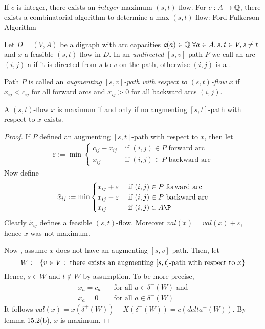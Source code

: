 \begin{cor}
	If $c$ is integer, there exists an \emph{integer} maximum $(s,t)$-flow. For $c: A \rightarrow \mathbb{Q}$, there exists a combinatorial algorithm to determine a max $(s,t)$ flow: Ford-Fulkerson Algorithm
\end{cor}
\begin{defn}
	Let $D = (V,A)$ be a digraph with arc capacities $c(a) \in \mathbb{Q} \; \forall a \in A, s,t \in V, s \not = t$ and $x$ a feasible $(s,t)$-flow in $D$. In an \emph{undirected} $[s,v]$-path $P$ we call an arc $(i,j)$ a  if it is directed from $s$ to $v$ on the path, otherwise $(i,j)$ is a .
	
	Path $P$ is called an \emph{augmenting $[s,v]$-path with respect to $(s,t)$-flow $x$} if $x_{ij} < c_{ij}$ for all forward arcs and $x_{ij} > 0$ for all backward arcs $(i,j)$.
\end{defn}
\begin{thm}
A $(s,t)$-flow $x$ is maximum if and only if no augmenting $[s,t]$-path with respect to $x$ exists.
\end{thm}

\begin{proof}
	If $P$ defined an augmenting $[s,t]$-path with respect to $x$, then let
	\begin{align*}
		\varepsilon := \min \begin{cases}
			c_{ij}-x_{ij} & \text{ if $(i,j) \in P$ forward arc} \\
			x_{ij} & \text{ if $(i,j) \in P$ backward arc}
		\end{cases}
	\end{align*}
	Now define
	\begin{align*}
		\tilde x_{ij} := \min \begin{cases}
			x_{ij} + \varepsilon &\text{ if $(i,j) \in P$ forward arc} \\
			x_{ij} - \varepsilon &\text{ if $(i,j) \in P$ backward arc} \\
			x_{ij} &\text{ if $(i,j) \in A\P$}
		\end{cases}
	\end{align*}
	Clearly $\tilde x_{ij}$ defines a feasible $(s,t)$-flow. Moreover $val(\tilde x) = val(x) + \varepsilon$, hence $x$ was not maximum.
	
	Now , assume $x$ does not have an augmenting $[s,v]$-path. Then, let
	\[
		W:=\left\{v\in V: \text{ there exists an augmenting $[s,t]$-path with respect to $x$}\right\}
	\]
	Hence, $s \in W$ and $t \not \in W$ by assumption. To be more precise,
	\begin{align*}
		x_a = c_a \quad &\text{for all } a \in \delta^+(W) \text{ and} \\
		x_a = 0 \quad & \text{for all } a \in \delta^-(W)
	\end{align*}
	It follows $val(x) = x ( \delta ^+(W))- X(\delta^-(W)) = c(delta^+(W))$. By lemma 15.2(b), $x$ is maximum.
\end{proof}	
